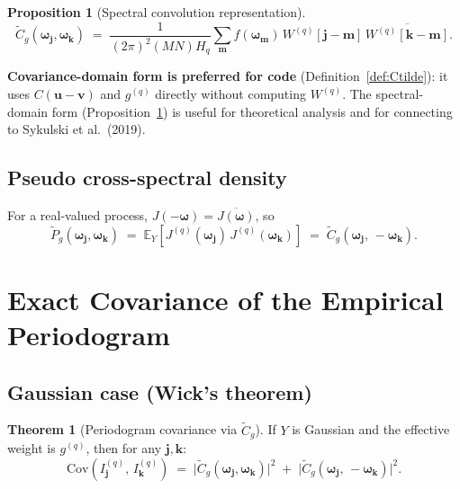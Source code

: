 \documentclass[12pt]{article}
\theoremstyle{definition}
\newtheorem{proposition}{Proposition}
\newtheorem{theorem}{Theorem}
\begin{document}
\begin{proposition}[Spectral convolution representation]
\label{prop:spectral_conv}
\[
  \tilde{C}_g(\boldsymbol{\omega}_{\mathbf{j}},\boldsymbol{\omega}_{\mathbf{k}})
  \;=\; \frac{1}{(2\pi)^2(MN)H_q}\sum_{\mathbf{m}} f(\boldsymbol{\omega}_{\mathbf{m}})\,
    W^{(q)}[\mathbf{j}-\mathbf{m}]\,\overline{W^{(q)}[\mathbf{k}-\mathbf{m}]}.
\]
\end{proposition}

\textbf{Covariance-domain form is preferred for code} (Definition~\ref{def:Ctilde}):
it uses $C(\mathbf{u}-\mathbf{v})$ and $g^{(q)}$ directly without computing $W^{(q)}$.
The spectral-domain form (Proposition~\ref{prop:spectral_conv}) is useful
for theoretical analysis and for connecting to Sykulski et al.\ (2019).

\subsection{Pseudo cross-spectral density}

For a real-valued process, $J(-\boldsymbol{\omega}) = \overline{J(\boldsymbol{\omega})}$, so
\[
  \tilde{P}_g(\boldsymbol{\omega}_{\mathbf{j}},\boldsymbol{\omega}_{\mathbf{k}})
  \;=\; \mathbb{E}_Y\!\left[J^{(q)}(\boldsymbol{\omega}_{\mathbf{j}})\,J^{(q)}(\boldsymbol{\omega}_{\mathbf{k}})\right]
  \;=\; \tilde{C}_g(\boldsymbol{\omega}_{\mathbf{j}},\,-\boldsymbol{\omega}_{\mathbf{k}}).
\]


\section{Exact Covariance of the Empirical Periodogram}
\label{sec:exact_cov}

\subsection{Gaussian case (Wick's theorem)}

\begin{theorem}[Periodogram covariance via $\tilde{C}_g$]
\label{thm:cov_gaussian}
If $Y$ is Gaussian and the effective weight is $g^{(q)}$, then for any $\mathbf{j},\mathbf{k}$:
\[
\boxed{
  \mathrm{Cov}(I^{(q)}_{\mathbf{j}},\, I^{(q)}_{\mathbf{k}})
  \;=\;
  \bigl|\tilde{C}_g(\boldsymbol{\omega}_{\mathbf{j}},\boldsymbol{\omega}_{\mathbf{k}})\bigr|^2
  \;+\;
  \bigl|\tilde{C}_g(\boldsymbol{\omega}_{\mathbf{j}},\,-\boldsymbol{\omega}_{\mathbf{k}})\bigr|^2.
}
\]
\end{theorem}
\end{document}
